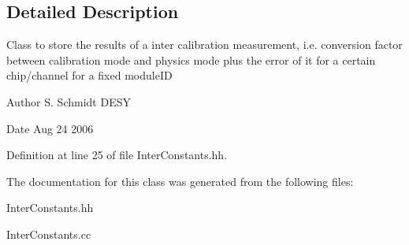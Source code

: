 \subsection{Detailed Description}
Class to store the results of a inter calibration measurement, i.e. conversion factor between calibration mode and physics mode plus the error of it for a certain chip/channel for a fixed moduleID \begin{DoxyAuthor}{Author}
S. Schmidt DESY 
\end{DoxyAuthor}
\begin{DoxyDate}{Date}
Aug 24 2006 
\end{DoxyDate}


Definition at line 25 of file InterConstants.hh.

The documentation for this class was generated from the following files:\begin{DoxyCompactItemize}
\item 
InterConstants.hh\item 
InterConstants.cc\end{DoxyCompactItemize}
